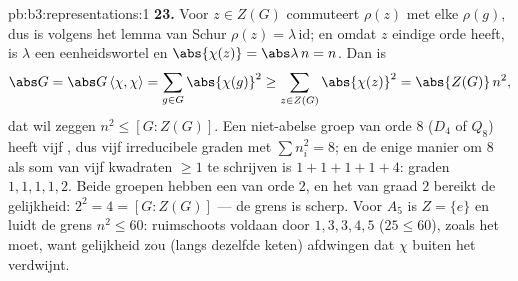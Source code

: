 \begin{solution}{pb:b3:representations:1}
\textbf{23.} Voor $z \in Z(G)$ commuteert $\rho(z)$ met elke
$\rho(g)$, dus is volgens het lemma van Schur $\rho(z) =
\lambda\,\mathrm{id}$; en omdat $z$ eindige orde heeft, is
$\lambda$ een eenheidswortel en $\abs{\chi(z)} = \abs\lambda\,n =
n$. Dan is
\[
\abs G = \abs G\,\langle\chi, \chi\rangle
= \sum_{g \in G}\abs{\chi(g)}^2
\geq \sum_{z \in Z(G)}\abs{\chi(z)}^2
= \abs{Z(G)}\,n^2,
\]
dat wil zeggen $n^2 \leq [G : Z(G)]$. Een niet-abelse groep van
orde $8$ ($D_4$ of $Q_8$) heeft vijf , dus vijf
irreducibele graden met $\sum n_i^2 = 8$; en de enige manier om
$8$ als som van vijf kwadraten $\geq 1$ te schrijven is $1 + 1 + 1
+ 1 + 4$: graden $1, 1, 1, 1, 2$. Beide groepen hebben een 
van orde $2$, en het  van graad $2$ bereikt de gelijkheid:
$2^2 = 4 = [G : Z(G)]$ --- de grens is scherp. Voor $A_5$ is $Z =
\{e\}$ en luidt de grens $n^2 \leq 60$: ruimschoots voldaan door
$1, 3, 3, 4, 5$ ($25 \leq 60$), zoals het moet, want gelijkheid
zou (langs dezelfde keten) afdwingen dat $\chi$ buiten het 
verdwijnt.


\end{solution}
